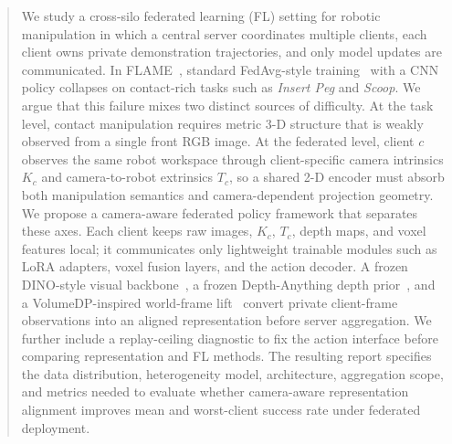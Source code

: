\documentclass{article}
\begin{document}

\makeatletter
\gdef\icmlcorrespondingauthor@text{Siwon Kim, Haeun Yun, Jinhyung Lee, Gihyun Baek}
\makeatother

\printAffiliationsAndNotice{}

\begin{abstract}
We study a cross-silo federated learning (FL) setting for robotic
manipulation in which a central server coordinates multiple
clients, each client owns private demonstration trajectories, and
only model updates are communicated. In FLAME~\cite{flame2025},
standard FedAvg-style training~\cite{fedavg} with a CNN policy
collapses on contact-rich tasks such as \emph{Insert Peg} and
\emph{Scoop}. We argue that this failure mixes two distinct
sources of difficulty. At the task level, contact manipulation
requires metric 3-D structure that is weakly observed from a
single front RGB image. At the federated level, client $c$ observes
the same robot workspace through client-specific camera intrinsics
$K_c$ and camera-to-robot extrinsics $T_c$, so a shared 2-D encoder
must absorb both manipulation semantics and camera-dependent
projection geometry. We propose a camera-aware federated policy
framework that separates these axes. Each client keeps raw images,
$K_c$, $T_c$, depth maps, and voxel features local; it communicates
only lightweight trainable modules such as LoRA adapters, voxel
fusion layers, and the action decoder. A frozen DINO-style visual
backbone~\cite{dinov2}, a frozen Depth-Anything depth
prior~\cite{depthanything}, and a VolumeDP-inspired
world-frame lift~\cite{volumedp2026} convert private
client-frame observations into an aligned representation before
server aggregation. We further include a replay-ceiling diagnostic
to fix the action interface before comparing representation and FL
methods. The resulting report specifies the data distribution,
heterogeneity model, architecture, aggregation scope, and metrics
needed to evaluate whether camera-aware representation alignment
improves mean and worst-client success rate under federated
deployment.
\end{abstract}
\end{document}

